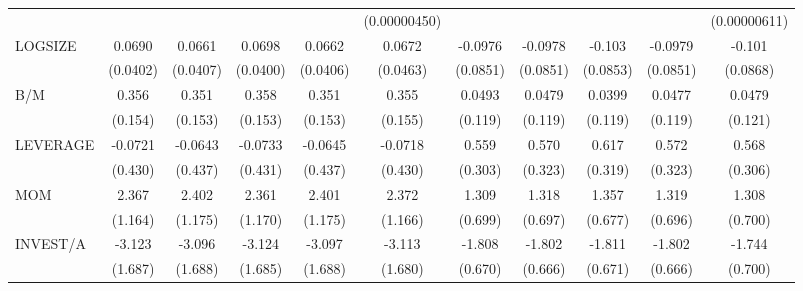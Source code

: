 \begin{table}[htbp]
\begin{tabular}{l*{10}{c}}
                &                  &                  &                  &                  &(0.00000450)         &                  &                  &                  &                  &(0.00000611)         \\
LOGSIZE         &   0.0690\sym{*}  &   0.0661         &   0.0698\sym{*}  &   0.0662         &   0.0672         &  -0.0976         &  -0.0978         &   -0.103         &  -0.0979         &   -0.101         \\
                & (0.0402)         & (0.0407)         & (0.0400)         & (0.0406)         & (0.0463)         & (0.0851)         & (0.0851)         & (0.0853)         & (0.0851)         & (0.0868)         \\
B/M             &    0.356\sym{**} &    0.351\sym{**} &    0.358\sym{**} &    0.351\sym{**} &    0.355\sym{**} &   0.0493         &   0.0479         &   0.0399         &   0.0477         &   0.0479         \\
                &  (0.154)         &  (0.153)         &  (0.153)         &  (0.153)         &  (0.155)         &  (0.119)         &  (0.119)         &  (0.119)         &  (0.119)         &  (0.121)         \\
LEVERAGE        &  -0.0721         &  -0.0643         &  -0.0733         &  -0.0645         &  -0.0718         &    0.559\sym{*}  &    0.570\sym{*}  &    0.617\sym{*}  &    0.572\sym{*}  &    0.568\sym{*}  \\
                &  (0.430)         &  (0.437)         &  (0.431)         &  (0.437)         &  (0.430)         &  (0.303)         &  (0.323)         &  (0.319)         &  (0.323)         &  (0.306)         \\
MOM             &    2.367\sym{**} &    2.402\sym{**} &    2.361\sym{**} &    2.401\sym{**} &    2.372\sym{**} &    1.309\sym{*}  &    1.318\sym{*}  &    1.357\sym{**} &    1.319\sym{*}  &    1.308\sym{*}  \\
                &  (1.164)         &  (1.175)         &  (1.170)         &  (1.175)         &  (1.166)         &  (0.699)         &  (0.697)         &  (0.677)         &  (0.696)         &  (0.700)         \\
INVEST/A        &   -3.123\sym{*}  &   -3.096\sym{*}  &   -3.124\sym{*}  &   -3.097\sym{*}  &   -3.113\sym{*}  &   -1.808\sym{***}&   -1.802\sym{***}&   -1.811\sym{***}&   -1.802\sym{***}&   -1.744\sym{**} \\
                &  (1.687)         &  (1.688)         &  (1.685)         &  (1.688)         &  (1.680)         &  (0.670)         &  (0.666)         &  (0.671)         &  (0.666)         &  (0.700)         \\

\end{tabular}
\end{table}
